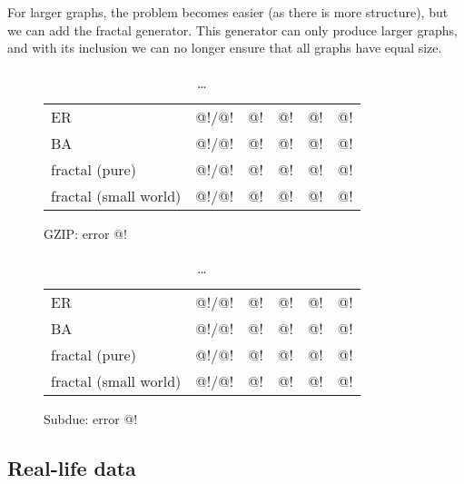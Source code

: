 \documentclass[10pt,a4paper,oneside]{article}
\begin{document}
For larger graphs, the problem becomes easier (as there is more structure), but we can add the fractal generator. This generator can only produce larger graphs, and with its inclusion we can no longer ensure that all graphs have equal size. 
\begin{table}[h]
\label{table:synthetic-large}
\begin{subfigure}[b]{1\columnwidth}
\begin{tabular}{l | r | r r r r}
\hline
  ER      & @!/@!  & @! & @! & @! & @! \\
  BA      & @!/@!  & @! & @! & @! & @!\\
  fractal (pure) & @!/@!  & @! & @! & @! & @!\\
  fractal (small world) & @!/@!  & @! & @! & @! & @!\\
\hline
\end{tabular}
\caption{GZIP: error @!}
\end{subfigure}
\vspace{3mm}

\begin{subfigure}[b]{1\columnwidth}
\begin{tabular}{l | r | r r r r}
\hline
  ER      & @!/@!  & @! & @! & @! & @! \\
  BA      & @!/@!  & @! & @! & @! & @!\\
  fractal (pure) & @!/@!  & @! & @! & @! & @!\\
  fractal (small world)& @!/@! & @! & @! & @! & @!\\
\hline
\end{tabular}
\caption{Subdue: error @!}
\end{subfigure}
\caption{\ldots}
\end{table}

\subsection*{Real-life data}
\end{document}
